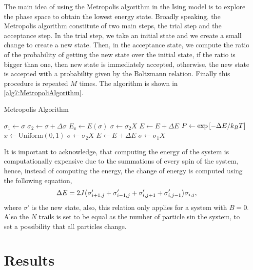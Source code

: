 \documentclass[main.tex]{subfiles}
\begin{document}
The main idea of using the Metropolis algorithm in the Ising model is to explore the phase space to obtain the lowest energy state.
Broadly speaking, the Metropolis algorithm constitute of two main steps, the trial step and the acceptance step.
In the trial step, we take an initial state and we create a small change to create a new state.
Then, in the acceptance state, we compute the ratio of the probability of getting the new state over the initial state, if the ratio is bigger than one, then new state is immediately accepted, otherwise, the new state is accepted with a probability given by the Boltzmann relation.
Finally this procedure is repeated $M$ times.
The algorithm is shown in \ref{alg7:MetropoliAlgorithm}.

\begin{algorithm}
\caption{Metropolis Algorithm}\label{alg7:MetropoliAlgorithm}
\begin{algorithmic}
            \State $\sigma_1\gets \sigma$
            \State $\sigma_2\gets \sigma+\Delta\sigma$
            \State $E_o\gets E(\sigma)$
                \State $\sigma \gets \sigma_2 X$
                \State $E\gets E+\Delta E$
            \Else
                \State $P\gets\exp\qty[-\Delta E/k_BT]$
                \State $x\gets\mathrm{Uniform}(0,1)$
                    \State $\sigma \gets \sigma_2 X$
                    \State $E\gets E+\Delta E$
                \Else
                    \State $\sigma \gets \sigma_1 X$
                \EndIf
            \EndIf
        \EndFor
    \EndFor
\end{algorithmic}
\end{algorithm}

It is important to acknowledge, that computing the energy of the system is computationally expensive due to the summations of every spin of the system, hence, instead of computing the energy, the change of energy is computed using the following equation,
\begin{gather*}
    \Delta E = 2J\qty(\sigma'_{i+1,j} +\sigma'_{i-1,j} +\sigma'_{i,j+1} +\sigma'_{i,j-1})\sigma_{i,j},
\end{gather*}
where $\sigma'$ is the new state, also, this relation only applies for a system with $B = 0$.
Also the $N$ trails is set to be equal as the number of particle sin the system, to set a possibility that all particles change.

\section{Results}
\end{document}
